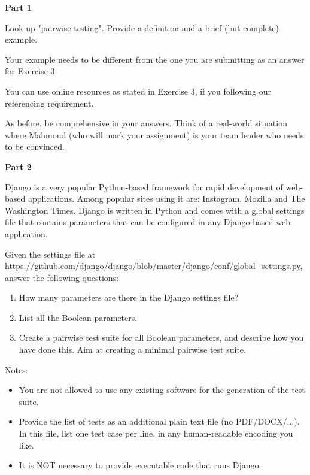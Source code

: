 \documentclass{pracs}
\begin{document}
\textbf{Part 1}

Look up "pairwise testing". Provide a definition and a brief (but complete) example.

Your example needs to be different from the one you are submitting as an answer for Exercise 3.

You can use online resources as stated in Exercise 3, if you following our referencing requirement.

As before, be comprehensive in your answers. Think of a real-world situation where Mahmoud (who will mark your assignment) is your team leader who needs to be convinced.

\textbf{Part 2}

Django is a very popular Python-based framework for rapid development of web-based applications. Among popular sites using it are: Instagram, Mozilla and The Washington Times. Django is written in Python and comes with a global settings file that contains parameters that can be configured in any Django-based web application. 

Given the settings file at \url{https://github.com/django/django/blob/master/django/conf/global_settings.py}, answer the following questions:

\begin{enumerate}
\item How many parameters are there in the Django settings file?
\item List all the Boolean parameters.
\item Create a pairwise test suite for all Boolean parameters, and describe how you have done this. Aim at creating a minimal pairwise test suite. 
\end{enumerate}

Notes:
\begin{itemize}
\item You are not allowed to use any existing software for the generation of the test suite.
\item Provide the list of tests as an additional plain text file (no PDF/DOCX/...). In this file, list one test case per line, in any human-readable encoding you like.
\item It is NOT necessary to provide executable code that runs Django.
\end{itemize}
\end{document}
